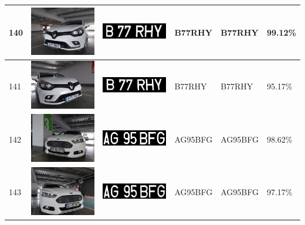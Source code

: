 \documentclass[a4paper,12pt]{report}
\begin{document}
\begin{longtable}{| m{0.6cm} | m{3cm} | m{3cm} | m{1.8cm} | m{1.8cm} | m{1.8cm} |}
    140 & \includegraphics[width=3cm,keepaspectratio]{dataset/82_d2.jpg}  & \includegraphics[width=3cm,keepaspectratio]{segmentari/140.jpg} & B77RHY              & B77RHY               & 99.12\%    \\ \hline
    141 & \includegraphics[width=3cm,keepaspectratio]{dataset/82_s1.jpg}  & \includegraphics[width=3cm,keepaspectratio]{segmentari/141.jpg} & B77RHY              & B77RHY               & 95.17\%    \\ \hline
    142 & \includegraphics[width=3cm,keepaspectratio]{dataset/83_d1.jpg}  & \includegraphics[width=3cm,keepaspectratio]{segmentari/142.jpg} & AG95BFG             & AG95BFG              & 98.62\%    \\ \hline
    143 & \includegraphics[width=3cm,keepaspectratio]{dataset/83_s1.jpg}  & \includegraphics[width=3cm,keepaspectratio]{segmentari/143.jpg} & AG95BFG             & AG95BFG              & 97.17\%    \\ \hline

\end{longtable}
\end{document}
